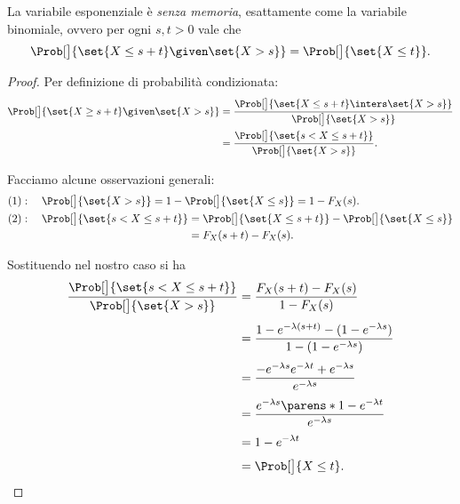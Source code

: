 La variabile esponenziale è \emph{senza memoria}, esattamente come la variabile binomiale, ovvero per ogni $s, t > 0$ vale che \[
    \Prob[\big]{\set{X \leq s + t} \given \set{X > s}} = \Prob[\big]{\set{X \leq t}}.    
\]
\begin{proof}
    Per definizione di probabilità condizionata:
    \begin{align*}
        \Prob[\big]{\set{X \geq s + t} \given \set{X > s}}
        &= \frac{\Prob[\big]{\set{X \leq s + t} \inters \set{X > s}}}{\Prob[\big]{\set{X > s}}}\\
        &= \frac{\Prob[\big]{\set{s < X \leq s + t}}}{\Prob[\big]{\set{X > s}}}.
    \end{align*}

    Facciamo alcune osservazioni generali:
    \begin{alignat*}{2}
        &(1):\; &&\Prob[\big]{\set{X > s}} = 1 - \Prob[\big]{\set{X \leq s}} = 1 - F_X(s).\\
        &(2):\; &&\begin{alignedat}[t]{1}
                \Prob[\big]{\set{s < X \leq s + t}} 
                &= \Prob[\big]{\set{X \leq s + t}} - \Prob[\big]{\set{X \leq s}} \\
                &= F_X(s+t) - F_X(s).
            \end{alignedat}
    \end{alignat*}

    Sostituendo nel nostro caso si ha \begin{align*}
        \frac{\Prob[\big]{\set{s < X \leq s + t}}}{\Prob[\big]{\set{X > s}}}
        &= \frac{F_X(s+t) - F_X(s)}{1 - F_X(s)}\\[3pt]
        &= \frac{1 - e^{-\lambda (s+t)} - (1 - e^{-\lambda s})}{1 - (1 - e^{-\lambda s})}\\[3pt]
        &= \frac{-e^{-\lambda s}e^{-\lambda t} + e^{-\lambda s}}{e^{-\lambda s}}\\[3pt]
        &= \frac{e^{-\lambda s}\parens*{1 - e^{-\lambda t}}}{e^{-\lambda s}}\\[3pt]
        &= 1 - e^{-\lambda t}\\[3pt]
        &= \Prob[\big]{X \leq t}. \qedhere
    \end{align*}
\end{proof}